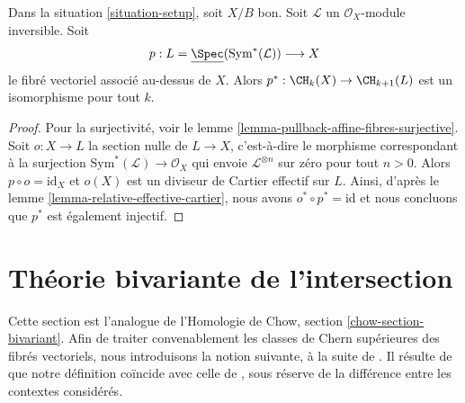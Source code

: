 \begin{lemma}
\label{lemma-linebundle}
Dans la situation \ref{situation-setup}, soit $X/B$ bon. Soit
$\mathcal{L}$ un $\mathcal{O}_X$-module inversible. Soit
$$
p :
L = \underline{\Spec}(\text{Sym}^*(\mathcal{L}))
\longrightarrow
X
$$
le fibré vectoriel associé au-dessus de $X$. Alors $p^* : \CH_k(X) \to \CH_{k +
1}(L)$ est un isomorphisme pour tout $k$.
\end{lemma}

\begin{proof}
Pour la surjectivité, voir le lemme
\ref{lemma-pullback-affine-fibres-surjective}. Soit $o : X \to L$ la section
nulle de $L \to X$, c'est-à-dire le morphisme correspondant à la surjection
$\text{Sym}^*(\mathcal{L}) \to \mathcal{O}_X$ qui envoie $\mathcal{L}^{\otimes
n}$ sur zéro pour tout $n > 0$. Alors $p \circ o = \text{id}_X$ et $o(X)$
est un diviseur de Cartier effectif sur $L$. Ainsi, d'après le lemme
\ref{lemma-relative-effective-cartier}, nous avons $o^* \circ p^* =
\text{id}$ et nous concluons que $p^*$ est également injectif.
\end{proof}























\section{Théorie bivariante de l'intersection}
\label{section-bivariant}

\noindent
Cette section est l'analogue de l'Homologie de Chow, section
\ref{chow-section-bivariant}. Afin de traiter convenablement les classes de Chern
supérieures des fibrés vectoriels, nous introduisons la notion suivante, à la
suite de \cite{FM}. Il résulte de \cite[Theorem 17.1]{F} que notre définition
coïncide avec celle de \cite{F}, sous réserve de la différence entre les
contextes considérés.

